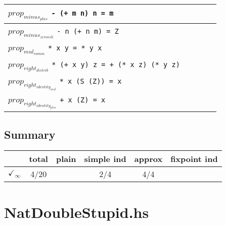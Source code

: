 \documentclass{article}
\begin{document}
\begin{longtable}{p{10cm} || c | c | c | c | }
\hline
$prop_{minus_{plus}}$ \newline \verb`- (+ m n) n = m` &  &  &  &  \\
\hline
$prop_{minus_{zeroish}}$ \newline \verb`- n (+ n m) = Z` &  &  &  &  \\
\hline
$prop_{mul_{comm}}$ \newline \verb`* x y = * y x` &  &  &  &  \\
\hline
$prop_{right_{distrib}}$ \newline \verb`* (+ x y) z = + (* x z) (* y z)` &  &  &  &  \\
\hline
$prop_{right_{identity_{mul}}}$ \newline \verb`* x (S (Z)) = x` &  &  &  &  \\
\hline
$prop_{right_{identity_{plus}}}$ \newline \verb`+ x (Z) = x` &  &  &  &  \\
\end{longtable}

\subsection*{Summary}
\begin{longtable}{p{4cm} || c | c | c | c | c | }
  & total & plain & simple ind & approx & fixpoint ind \\
\hline
$\checkmark_{\infty}$ & 4/20 &  & 2/4 & 4/4 & \\
\end{longtable}

\section*{NatDoubleStupid.hs}
\end{document}
